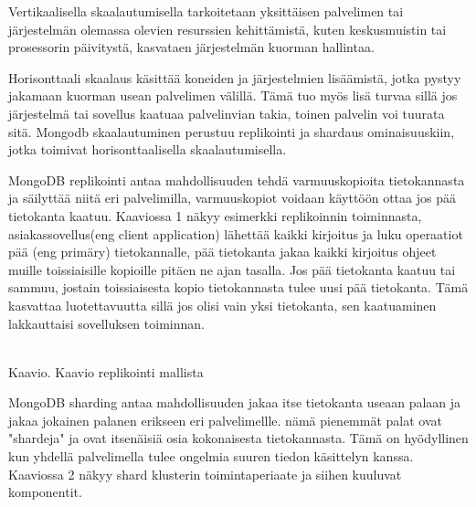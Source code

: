 Vertikaalisella skaalautumisella tarkoitetaan yksittäisen palvelimen tai järjestelmän olemassa olevien resurssien kehittämistä, 
kuten keskusmuistin tai prosessorin päivitystä, kasvataen järjestelmän kuorman hallintaa.
\medskip

Horisonttaali skaalaus käsittää koneiden ja järjestelmien lisäämistä, jotka pystyy jakamaan kuorman usean palvelimen välillä.
Tämä tuo myös lisä turvaa sillä jos järjestelmä tai sovellus kaatuaa palvelinvian takia, 
toinen palvelin voi tuurata sitä. 
Mongodb skaalautuminen perustuu replikointi ja shardaus ominaisuuskiin, jotka toimivat horisonttaalisella skaalautumisella. 
\medskip






MongoDB replikointi antaa mahdollisuuden tehdä varmuuskopioita tietokannasta ja säilyttää niitä eri palvelimilla, 
varmuuskopiot voidaan käyttöön ottaa jos pää tietokanta kaatuu. 
%
Kaaviossa 1 näkyy esimerkki replikoinnin toiminnasta, asiakassovellus(eng client application) lähettää kaikki kirjoitus ja luku operaatiot pää (eng primäry) tietokannalle, 
pää tietokanta jakaa kaikki kirjoitus ohjeet muille toissiaisille kopioille pitäen ne ajan tasalla.
Jos pää tietokanta kaatuu tai sammuu, jostain toissiaisesta kopio tietokannasta tulee uusi pää tietokanta.
Tämä kasvattaa luotettavuutta sillä jos olisi vain yksi tietokanta, sen kaatuaminen lakkauttaisi sovelluksen toiminnan. 
\medskip
\bigskip

\\
Kaavio\getChartCount{}. Kaavio replikointi mallista 
\medskip



MongoDB sharding antaa mahdollisuuden jakaa itse tietokanta useaan palaan ja jakaa jokainen palanen erikseen eri palvelimellle.
nämä pienemmät palat ovat "shardeja"{} ja ovat itsenäisiä osia kokonaisesta tietokannasta.
%
Tämä on hyödyllinen kun yhdellä palvelimella tulee ongelmia suuren tiedon käsittelyn kanssa.
Kaaviossa 2 näkyy shard klusterin toimintaperiaate ja siihen kuuluvat komponentit. 
\medskip
\bigskip




